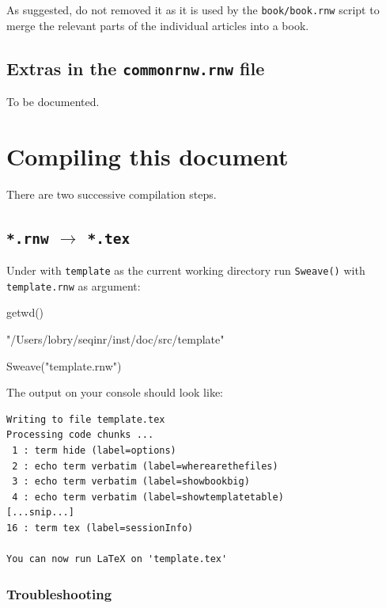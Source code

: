 \documentclass{article}
\begin{document}
As suggested, do not removed it as it is used by the \texttt{book/book.rnw}
script to merge the relevant parts of the individual articles into
a book.

\subsection{Extras in the \texttt{commonrnw.rnw} file}

To be documented.

\section{Compiling this document}

There are two successive compilation steps.

\subsection{\texttt{*.rnw} $\rightarrow$ \texttt{*.tex}}

Under \Rlogo{} with \texttt{template} as the current working directory
run \texttt{Sweave()} with \texttt{template.rnw} as argument:

\begin{Schunk}
\begin{Sinput}
 getwd()
\end{Sinput}
\begin{Soutput}
[1] "/Users/lobry/seqinr/inst/doc/src/template"
\end{Soutput}
\end{Schunk}
\begin{Schunk}
\begin{Sinput}
 Sweave("template.rnw")
\end{Sinput}
\end{Schunk}

The output on your \Rlogo{} console should look like:

\begin{verbatim}
Writing to file template.tex
Processing code chunks ...
 1 : term hide (label=options)
 2 : echo term verbatim (label=wherearethefiles)
 3 : echo term verbatim (label=showbookbig)
 4 : echo term verbatim (label=showtemplatetable)
[...snip...]
16 : term tex (label=sessionInfo)

You can now run LaTeX on 'template.tex'
\end{verbatim}

\subsubsection{Troubleshooting}
\end{document}
